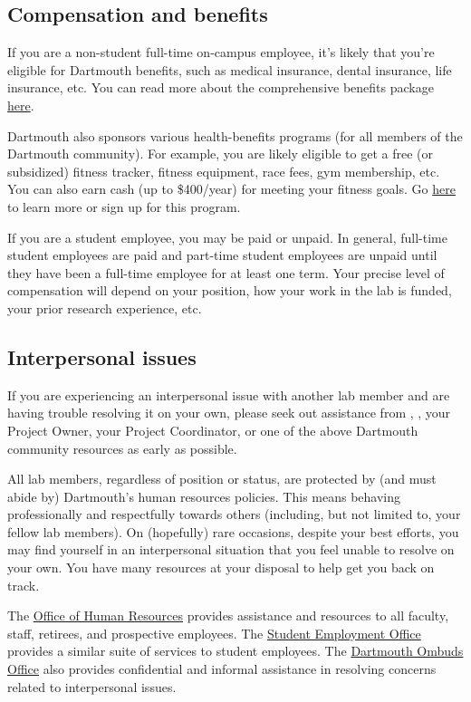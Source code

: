 \documentclass{tufte-book} %
\begin{document}
\subsection{Compensation and benefits}
If you are a non-student full-time on-campus employee, it's likely that
you're eligible for Dartmouth benefits, such as medical insurance,
dental insurance, life insurance, etc.  You can read more about the
comprehensive benefits package \href{http://www.dartmouth.edu/~hrs/benefits/}{here}.

Dartmouth also sponsors various health-benefits programs (for all
members of the Dartmouth community).  For example, you are likely
eligible to get a free (or subsidized) fitness tracker, fitness
equipment, race fees, gym membership, etc.  You can also earn cash (up
to \$400/year) for meeting your fitness goals.  Go
\href{http://join.virginpulse.com/dartmouth/}{here} to learn more or
sign up for this program.

If you are a student employee, you may be paid or unpaid.  In general,
full-time student employees are paid and part-time student employees
are unpaid until they have been a full-time employee for at least one
term.  Your precise level of compensation will depend on your
position, how your work in the lab is funded, your prior research
experience, etc.

\subsection{Interpersonal issues}
 If you are experiencing an
interpersonal issue with another lab member and are having trouble
resolving it on your own, please seek out assistance from \director,
\coordinator, your Project Owner, your Project Coordinator, or one of
the above Dartmouth community resources as early as possible.

All lab members, regardless of position or status, are protected by
(and must abide by) Dartmouth's human resources policies.  This means
behaving professionally and respectfully towards others (including,
but not limited to, your fellow lab members).  On (hopefully) rare
occasions, despite your best efforts, you may find yourself in an
interpersonal situation that you feel unable to resolve on your own.
You have many resources at your disposal to help get you back on
track.

The \href{http://www.dartmouth.edu/~hrs/}{Office of Human Resources}
provides assistance and resources to all faculty, staff, retirees, and
prospective employees. The
\href{http://www.dartmouth.edu/~seo/}{Student Employment Office}
provides a similar suite of services to student employees.  The
\href{http://www.dartmouth.edu/~ombuds/}{Dartmouth Ombuds Office} also
provides confidential and informal assistance in resolving concerns
related to interpersonal issues.
\end{document}
